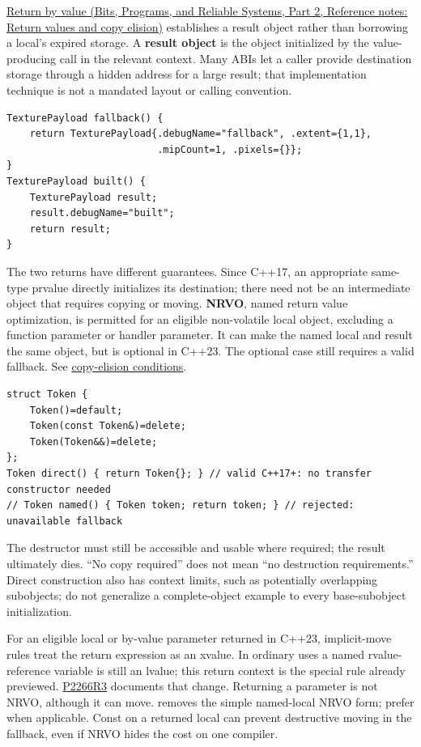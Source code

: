 \hypertarget{05-engine-i-ch003-return-a-result-without-handing-out-a-lifetime-problem}{}

\href{../01-Bits-Programs-and-Reliable-Systems-P02/main.pdf\#appendix-b08d3788c5c6}{Return by value (Bits, Programs, and Reliable Systems, Part 2, Reference notes: Return values and copy elision)} establishes a result object rather than borrowing a local's expired storage. A \textbf{result object} is the object initialized by the value-producing call in the relevant context. Many ABIs let a caller provide destination storage through a hidden address for a large result; that implementation technique is not a mandated layout or calling convention.

\begin{verbatim}
TexturePayload fallback() {
    return TexturePayload{.debugName="fallback", .extent={1,1},
                          .mipCount=1, .pixels={}};
}
TexturePayload built() {
    TexturePayload result;
    result.debugName="built";
    return result;
}
\end{verbatim}

The two returns have different guarantees. Since C++17, an appropriate same-type prvalue directly initializes its destination; there need not be an intermediate object that requires copying or moving. \textbf{NRVO}, named return value optimization, is permitted for an eligible non-volatile local object, excluding a function parameter or handler parameter. It can make the named local and result the same object, but is optional in C++23. The optional case still requires a valid fallback. See \href{https://eel.is/c++draft/class.copy.elision}{copy-elision conditions}.

\begin{verbatim}
struct Token {
    Token()=default;
    Token(const Token&)=delete;
    Token(Token&&)=delete;
};
Token direct() { return Token{}; } // valid C++17+: no transfer constructor needed
// Token named() { Token token; return token; } // rejected: unavailable fallback
\end{verbatim}

The destructor must still be accessible and usable where required; the result ultimately dies. ``No copy required'' does not mean ``no destruction requirements.'' Direct construction also has context limits, such as potentially overlapping subobjects; do not generalize a complete-object example to every base-subobject initialization.

For an eligible local or by-value parameter returned in C++23, implicit-move rules treat the return expression as an xvalue. In ordinary uses a named rvalue-reference variable is still an lvalue; this return context is the special rule already previewed. \href{https://www.open-std.org/jtc1/sc22/wg21/docs/papers/2022/p2266r3.html}{P2266R3} documents that change. Returning a parameter is not NRVO, although it can move.  removes the simple named-local NRVO form; prefer  when applicable. Const on a returned local can prevent destructive moving in the fallback, even if NRVO hides the cost on one compiler.

